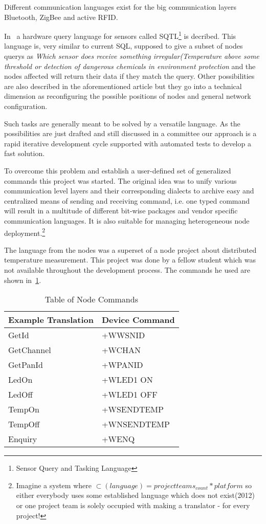 Different communication languages exist for the big communication layers Bluetooth, ZigBee and active RFID.

In~\cite[p. 407]{Akyildiz02wirelesssensor} a hardware query language for sensors called \textsc{SQTL}\footnote{Sensor Query and Tasking Language}
is decribed. This language is, very similar to current \textsc{SQL}, supposed to give a subset of nodes querys as \textit{Which sensor does receive
something irregular(Temperature above some threshold or detection of dangerous chemicals in environment protection} and the nodes affected 
will return their data if they match the query. Other possibilities are also described in the aforementioned article but they go into a technical
dimension as reconfiguring the possible positions of nodes and general network configuration.

Such tasks are generally meant to be solved by a versatile language. As the possibilities are just drafted and still discussed in a committee our 
approach is a rapid iterative development cycle supported with automated tests to develop a fast solution.

To overcome this problem and establish a user-defined set of generalized commands this project was started.
The original idea was to unify various communication level layers and their corresponding dialects to 
archive easy and centralized means of sending and receiving command, i.e. one typed command will result in 
a multitude of different bit-wise packages and vendor specific communication languages.
It is also suitable for managing heterogeneous node deployment.\footnote{Imagine a system where \(\subset(language)=project teams_{count} * platform \) 
so either everybody uses some established language which does not exist(2012) or one project team is solely occupied with 
making a translator - for every project!}

The language from the nodes was a superset of a node project about distributed temperature measurement. This project was done by 
a fellow student which was not available throughout the development process. The commands he used are shown in~\ref{tab:nodecommands}.

\begin{table}[!h] 
\centering 
\begin{tabular}{|l||l|} 
Example Translation & Device Command \\ 
\hline
GetId & +WWSNID \\
GetChannel & +WCHAN \\
GetPanId & +WPANID \\
LedOn & +WLED1 ON \\
LedOff & +WLED1 OFF \\
TempOn & +WSENDTEMP \\
TempOff & +WNSENDTEMP \\
Enquiry & +WENQ \\
\end{tabular} 
\caption{ Table of Node Commands} 
\label{tab:nodecommands} 
\end{table}

